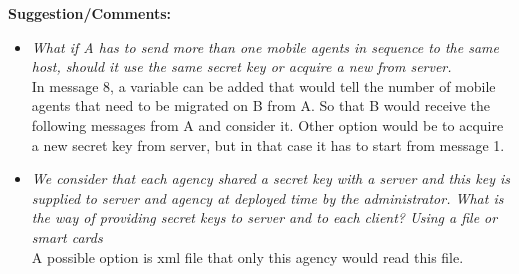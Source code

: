 \documentclass[letterpaper]{article}
\begin{document}
\textbf{Suggestion/Comments: }
\begin{itemize}
\item \textit{What if A has to send more than one mobile agents in sequence to the same 
host, should it use the same secret key or acquire a new from server.}\\
In message 8, a variable can be added that would tell the number of mobile agents that 
need to be migrated on B from A. So that B would receive the following messages from A 
and consider it. Other option would be to acquire a new secret key from server, but in 
that case it has to start from message 1.
\item \textit{We consider that each agency shared a secret key with a server and this 
key is supplied to server and agency at deployed time by the administrator. What is the 
way of providing secret keys to server and to each client? Using a file or smart cards}\\
A possible option is xml file that only this agency would read this file.
\end{itemize}
\end{document}
